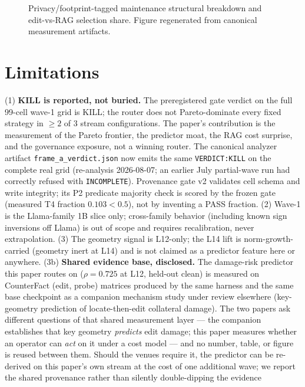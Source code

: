 \documentclass[preprint,12pt]{elsarticle}
\begin{document}
\begin{figure}[t]
\centering

\caption{Privacy/footprint-tagged maintenance structural breakdown and edit-vs-RAG selection
share. Figure regenerated from canonical measurement artifacts.}
\label{fig:privacy-tagged}
\end{figure}

\section{Limitations}
\label{sec:limitations}
(1) \textbf{KILL is reported, not buried.} The preregistered gate verdict on the
full 99-cell wave-1 grid is KILL; the router does not Pareto-dominate every fixed
strategy in $\ge 2$ of 3 stream configurations. The paper's contribution is the measurement of the
Pareto frontier, the predictor moat, the RAG cost surprise, and the governance
exposure, not a winning router. The canonical analyzer artifact
\texttt{frame\_a\_verdict.json} now emits the same \texttt{VERDICT:KILL} on the complete
real grid (re-analysis 2026-08-07; an earlier July partial-wave run had correctly refused
with \texttt{INCOMPLETE}). Provenance gate v2 validates cell schema and write integrity;
its P2 predicate majority check is scored by the frozen gate (measured T4 fraction
$0.103{<}0.5$), not by inventing a PASS fraction. (2) Wave-1 is the Llama-family 1B slice only;
cross-family behavior (including known sign inversions off Llama) is out of scope
and requires recalibration, never extrapolation. (3) The geometry signal is L12-only;
the L14 lift is norm-growth-carried (geometry inert at L14) and is not claimed
as a predictor feature here or anywhere. (3b) \textbf{Shared evidence base,
disclosed.} The damage-risk predictor this paper routes on ($\rho = 0.725$ at
L12, held-out clean) is measured on CounterFact (edit, probe) matrices
produced by the same harness and the same base checkpoint as a companion
mechanism study under review elsewhere (key-geometry prediction of
locate-then-edit collateral damage). The two papers ask different questions of
that shared measurement layer --- the companion establishes that key geometry
\emph{predicts} edit damage; this paper measures whether an operator can
\emph{act} on it under a cost model --- and no number, table, or figure is
reused between them. Should the venues require it, the predictor can be
re-derived on this paper's own stream at the cost of one additional wave; we
report the shared provenance rather than silently double-dipping the evidence
\end{document}
